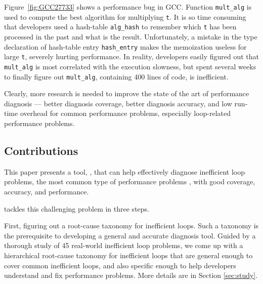 Figure~\ref{fig:GCC27733} shows a performance bug in GCC. 
Function \texttt{mult\_alg} is used to compute the best algorithm for 
multiplying \texttt{t}. It is so time consuming that developers used a
hash-table
\texttt{alg\_hash} to remember which \texttt{t} has been processed
in the past and what is the result. 
Unfortunately, a mistake in the type declaration of hash-table
entry \texttt{hash\_entry} makes the memoization useless for large \texttt{t},
severely hurting performance.
In reality, developers easily figured out that
\texttt{mult\_alg} is most correlated with the execution slowness, but
spent several weeks to finally figure out \texttt{mult\_alg}, 
containing 400 lines
of code, is
inefficient.

Clearly, more research is needed to improve the state of the art of performance
diagnosis --- better diagnosis
coverage, better diagnosis accuracy, and low run-time
overhead for common performance problems,
especially loop-related performance problems.


\subsection{Contributions}
This paper presents a tool, \Tool, that can help effectively diagnose
inefficient loop problems, the most common type of performance problems
\cite{SongOOPSLA2014,PerfBug}, with good coverage, accuracy, and performance.

\Tool tackles this challenging problem in three steps.

First, figuring out a root-cause taxonomy for inefficient loops.
Such a taxonomy is the prerequisite to developing a general and accurate
diagnosis tool. Guided by a thorough study of 45 real-world inefficient
loop problems, we come up with a hierarchical root-cause taxonomy for
inefficient loops that are
general enough to cover
common inefficient loops, and also specific enough to help developers understand
and fix performance problems. More details are
in Section \ref{sec:study}.
 
